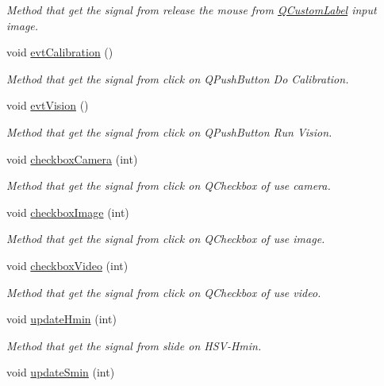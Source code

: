 \begin{DoxyCompactItemize}
\begin{DoxyCompactList}\small\item\em Method that get the signal from release the mouse from \hyperlink{classQCustomLabel}{Q\+Custom\+Label} input image. \end{DoxyCompactList}\item 
void \hyperlink{classMainWindow_a0057a9faf5830055b8a2117a5d1a9ffa}{evt\+Calibration} ()
\begin{DoxyCompactList}\small\item\em Method that get the signal from click on Q\+Push\+Button Do Calibration. \end{DoxyCompactList}\item 
void \hyperlink{classMainWindow_a202a597ababe8aa1fd3c821e703599b6}{evt\+Vision} ()
\begin{DoxyCompactList}\small\item\em Method that get the signal from click on Q\+Push\+Button Run Vision. \end{DoxyCompactList}\item 
void \hyperlink{classMainWindow_afb1276b4a282f8678e25b0ec1a0195c9}{checkbox\+Camera} (int)
\begin{DoxyCompactList}\small\item\em Method that get the signal from click on Q\+Checkbox of use camera. \end{DoxyCompactList}\item 
void \hyperlink{classMainWindow_aa0266c5762b37479a888fba709aefbee}{checkbox\+Image} (int)
\begin{DoxyCompactList}\small\item\em Method that get the signal from click on Q\+Checkbox of use image. \end{DoxyCompactList}\item 
void \hyperlink{classMainWindow_a33f858356490a2440246af76ca922392}{checkbox\+Video} (int)
\begin{DoxyCompactList}\small\item\em Method that get the signal from click on Q\+Checkbox of use video. \end{DoxyCompactList}\item 
void \hyperlink{classMainWindow_afffdad16c118e2351cec7b47c243e9b1}{update\+Hmin} (int)\hypertarget{classMainWindow_afffdad16c118e2351cec7b47c243e9b1}{}\label{classMainWindow_afffdad16c118e2351cec7b47c243e9b1}

\begin{DoxyCompactList}\small\item\em Method that get the signal from slide on H\+S\+V-\/\+Hmin. \end{DoxyCompactList}\item 
void \hyperlink{classMainWindow_a11f3aa0b929685232b671cd378d31972}{update\+Smin} (int)\hypertarget{classMainWindow_a11f3aa0b929685232b671cd378d31972}{}\label{classMainWindow_a11f3aa0b929685232b671cd378d31972}


\end{DoxyCompactItemize}
